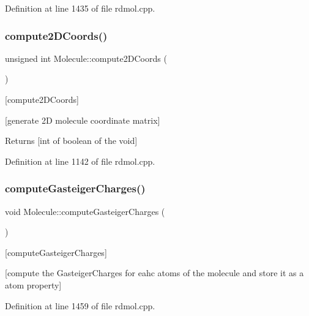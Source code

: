 Definition at line 1435 of file rdmol.\+cpp.

\mbox{\label{class_molecule_a0add82d890a92f6b9cab8099becf966f}} 
\subsubsection{\texorpdfstring{compute2\+D\+Coords()}{compute2DCoords()}}
{\footnotesize\ttfamily unsigned int Molecule\+::compute2\+D\+Coords (\begin{DoxyParamCaption}{ }\end{DoxyParamCaption})}



\mbox{[}compute2\+D\+Coords\mbox{]} 

\mbox{[}generate 2D molecule coordinate matrix\mbox{]}

\begin{DoxyReturn}{Returns}
\mbox{[}int of boolean of the void\mbox{]} 
\end{DoxyReturn}


Definition at line 1142 of file rdmol.\+cpp.

\mbox{\label{class_molecule_ad5c41d17dd1d3b564f85f97620cc508b}} 
\subsubsection{\texorpdfstring{compute\+Gasteiger\+Charges()}{computeGasteigerCharges()}}
{\footnotesize\ttfamily void Molecule\+::compute\+Gasteiger\+Charges (\begin{DoxyParamCaption}{ }\end{DoxyParamCaption})}



\mbox{[}compute\+Gasteiger\+Charges\mbox{]} 

\mbox{[}compute the Gasteiger\+Charges for eahc atoms of the molecule and store it as a atom property\mbox{]} 

Definition at line 1459 of file rdmol.\+cpp.

\mbox{\label{class_molecule_a5dcf9622623a09d43d9a2bc9d381a67e}} 
